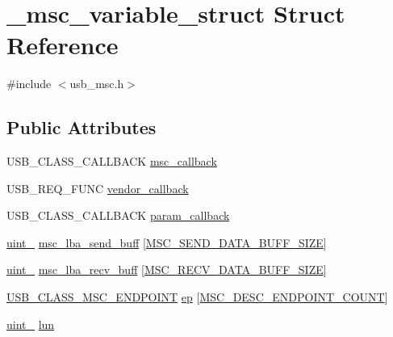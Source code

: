 \hypertarget{struct__msc__variable__struct}{}\section{\+\_\+msc\+\_\+variable\+\_\+struct Struct Reference}
\label{struct__msc__variable__struct}


{\ttfamily \#include $<$usb\+\_\+msc.\+h$>$}

\subsection*{Public Attributes}
\begin{DoxyCompactItemize}
\item 
U\+S\+B\+\_\+\+C\+L\+A\+S\+S\+\_\+\+C\+A\+L\+L\+B\+A\+CK \hyperlink{struct__msc__variable__struct_a2e8b209bd4a9b957386bef360ad58bb8}{msc\+\_\+callback}
\item 
U\+S\+B\+\_\+\+R\+E\+Q\+\_\+\+F\+U\+NC \hyperlink{struct__msc__variable__struct_a84a609bed15d4ab6d267a8cc2a096f1f}{vendor\+\_\+callback}
\item 
U\+S\+B\+\_\+\+C\+L\+A\+S\+S\+\_\+\+C\+A\+L\+L\+B\+A\+CK \hyperlink{struct__msc__variable__struct_a380827d386b5d511ecf66941f52edbc2}{param\+\_\+callback}
\item 
\hyperlink{types_8h_ad3209046c23f739a81581c10a4be7d92}{uint\+\_} \hyperlink{struct__msc__variable__struct_a0e5aebfc79889e7d53d24a59a8eab69c}{msc\+\_\+lba\+\_\+send\+\_\+buff} \mbox{[}\hyperlink{usb__msc_8h_a62a24eab8192c0022487ece78afefa72}{M\+S\+C\+\_\+\+S\+E\+N\+D\+\_\+\+D\+A\+T\+A\+\_\+\+B\+U\+F\+F\+\_\+\+S\+I\+ZE}\mbox{]}
\item 
\hyperlink{types_8h_ad3209046c23f739a81581c10a4be7d92}{uint\+\_} \hyperlink{struct__msc__variable__struct_a43b4448e9a478ac4a0e39cfe233c4aaa}{msc\+\_\+lba\+\_\+recv\+\_\+buff} \mbox{[}\hyperlink{usb__msc_8h_a5c8c5f642e591e5f23368f81896a6f74}{M\+S\+C\+\_\+\+R\+E\+C\+V\+\_\+\+D\+A\+T\+A\+\_\+\+B\+U\+F\+F\+\_\+\+S\+I\+ZE}\mbox{]}
\item 
\hyperlink{usb__msc_8h_ab2d092841de016ccfe46f11bdd9d6f99}{U\+S\+B\+\_\+\+C\+L\+A\+S\+S\+\_\+\+M\+S\+C\+\_\+\+E\+N\+D\+P\+O\+I\+NT} \hyperlink{struct__msc__variable__struct_acaa951b403a7dfb61afb5342b907f4e3}{ep} \mbox{[}\hyperlink{usb__descriptor_8h_a6ed1bc5f91977c790c649aed7e7dce8b}{M\+S\+C\+\_\+\+D\+E\+S\+C\+\_\+\+E\+N\+D\+P\+O\+I\+N\+T\+\_\+\+C\+O\+U\+NT}\mbox{]}
\item 
\hyperlink{types_8h_ad3209046c23f739a81581c10a4be7d92}{uint\+\_} \hyperlink{struct__msc__variable__struct_a4c796ff94ca53f300c896c0a3f3a2d82}{lun}

\end{DoxyCompactItemize}
